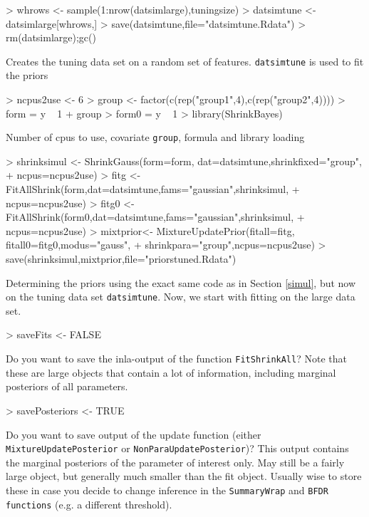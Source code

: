 \documentclass[11pt]{article}
\newcommand{\para}{\bigskip\noindent}
\begin{document}
\begin{Schunk}
\begin{Sinput}
> whrows <- sample(1:nrow(datsimlarge),tuningsize)
> datsimtune <- datsimlarge[whrows,]
> save(datsimtune,file="datsimtune.Rdata")
> rm(datsimlarge);gc()
\end{Sinput}
\end{Schunk}
Creates the tuning data set on a random set of features. {\tt datsimtune} is used to
fit the priors

\begin{Schunk}
\begin{Sinput}
> ncpus2use <- 6
> group <- factor(c(rep("group1",4),c(rep("group2",4))))
> form = y ~  1 + group
> form0 = y ~  1
> library(ShrinkBayes)
\end{Sinput}
\end{Schunk}
Number of cpus to use, covariate {\tt group}, formula and library loading

\begin{Schunk}
\begin{Sinput}
> shrinksimul <- ShrinkGauss(form=form, dat=datsimtune,shrinkfixed="group",
+ ncpus=ncpus2use)
> fitg <- FitAllShrink(form,dat=datsimtune,fams="gaussian",shrinksimul,
+ ncpus=ncpus2use)
> fitg0 <- FitAllShrink(form0,dat=datsimtune,fams="gaussian",shrinksimul,
+ ncpus=ncpus2use)
> mixtprior<- MixtureUpdatePrior(fitall=fitg, fitall0=fitg0,modus="gauss",
+ shrinkpara="group",ncpus=ncpus2use)
> save(shrinksimul,mixtprior,file="priorstuned.Rdata")
\end{Sinput}
\end{Schunk}
Determining the priors using the exact same code as in Section \ref{simul}, but now on the tuning data set {\tt datsimtune}.
Now, we start with fitting on the large data set.

\para
\begin{Schunk}
\begin{Sinput}
> saveFits <- FALSE
\end{Sinput}
\end{Schunk}
Do you want to save the inla-output of the function {\tt FitShrinkAll}? Note that these are large objects that contain
a lot of information, including marginal posteriors of all parameters.

\begin{Schunk}
\begin{Sinput}
> savePosteriors <- TRUE
\end{Sinput}
\end{Schunk}
Do you want to save output of the update function (either {\tt MixtureUpdatePosterior} or {\tt NonParaUpdatePosterior})?
This output contains the marginal posteriors of the parameter of interest only. May still be a fairly large object,
but generally much smaller than the fit object. Usually wise to store these in case you decide to change inference
in the {\tt SummaryWrap} and {\tt BFDR functions} (e.g. a different threshold).
\end{document}
